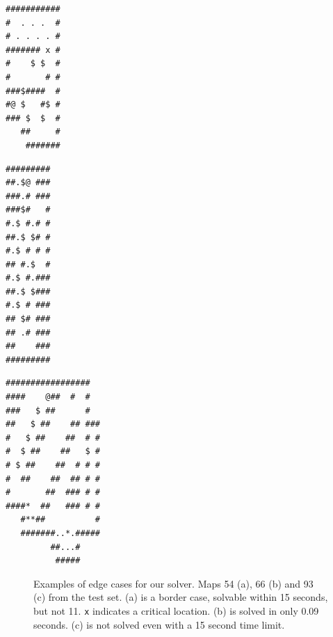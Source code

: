 \documentclass[a4paper,11pt]{article}
\begin{document}
\begin{lrbox}{\mapff}
  \begin{minipage}{.25\textwidth}
\centering
\begin{BVerbatim}
###########
#  . . .  #
# . . . . #
####### x #
#    $ $  #
#       # #
###$####  #
#@ $   #$ #
### $  $  #
   ##     #
    #######  
\end{BVerbatim}
  \end{minipage}
\end{lrbox}%

\begin{lrbox}{\mapss}
  \begin{minipage}{.25\textwidth}
\centering
\begin{BVerbatim}
#########
##.$@ ###
###.# ###
###$#   #
#.$ #.# #
##.$ $# #
#.$ # # #
## #.$  #
#.$ #.###
##.$ $###
#.$ # ###
## $# ###
## .# ###
##    ###
#########
\end{BVerbatim}
  \end{minipage}
\end{lrbox}%

\begin{lrbox}{\mapnt}
  \begin{minipage}{.25\textwidth}
\centering
\begin{BVerbatim}
#################  
####    @##  #  #  
###   $ ##      #  
##   $ ##    ## ###
#   $ ##    ##  # #
#  $ ##    ##   $ #
# $ ##    ##  # # #
#  ##    ##  ## # #
#       ##  ### # #
####*  ##   ### # #
   #**##          #
   #######..*.#####
         ##...#    
          #####
\end{BVerbatim}
  \end{minipage}
\end{lrbox}%


\begin{figure}
  \centering
  \subfloat[Unsolved]{\usebox{\mapnt}}
  \caption{Examples of edge cases for our solver. Maps 54 (a), 66 (b) and 93 (c)
    from the test set. (a) is a border case, solvable within 15 seconds, but not
    11. \texttt{x} indicates a critical location. (b) is solved in only 0.09
    seconds. (c) is not solved even with a 15 second time limit.}
  \label{fig:edgemap}
\end{figure}
\end{document}

